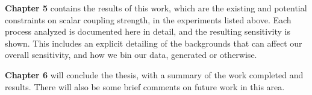 \textbf{Chapter 5} contains the results of this work, which are the existing and potential constraints on scalar coupling strength, in the experiments listed above.
Each process analyzed is documented here in detail, and the resulting sensitivity is shown.
This includes an explicit detailing of the backgrounds that can affect our overall sensitivity, and how we bin our data, generated or otherwise.

\textbf{Chapter 6} will conclude the thesis, with a summary of the work completed and results.
There will also be some brief comments on future work in this area.
